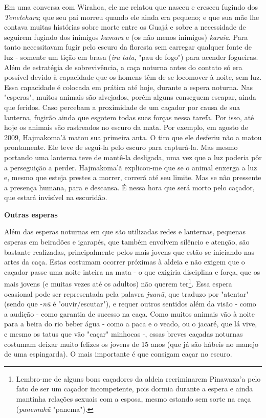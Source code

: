 Em uma conversa com Wirahoa, ele me relatou que nasceu e cresceu fugindo
dos \emph{Tenetehara}; que seu pai morreu quando ele ainda era pequeno;
e que sua mãe lhe contava muitas histórias sobre morte entre os Guajá e
sobre a necessidade de seguirem fugindo dos inimigos \emph{kamara} e (os
não menos inimigos) \emph{karaia}. Para tanto necessitavam fugir pelo
escuro da floresta sem carregar qualquer fonte de luz - somente um tição
em brasa (\emph{ira} \emph{tata}, "pau de fogo") para acender fogueiras.
Além de estratégia de sobrevivência, a caça noturna antes do contato só
era possível devido à capacidade que os homens têm de se locomover à
noite, sem luz. Essa capacidade é colocada em prática até hoje, durante
a espera noturna. Nas "esperas", muitos animais são alvejados, porém
alguns conseguem escapar, ainda que feridos. Caso percebam a proximidade
de um caçador por causa de sua lanterna, fugirão ainda que esgotem todas
suas forças nessa tarefa. Por isso, até hoje os animais são rastreados
no escuro da mata. Por exemplo, em agosto de 2009, Hajmakoma'ã matou sua
primeira anta. O tiro que ele desferiu não a matou prontamente. Ele teve
de segui-la pelo escuro para capturá-la. Mas mesmo portando uma lanterna
teve de mantê-la desligada, uma vez que a luz poderia pôr a perseguição
a perder. Hajmakoma'ã explicou-me que se o animal enxerga a luz e, mesmo
que esteja prestes a morrer, correrá até seu limite. Mas se não
pressente a presença humana, para e descansa. É nessa hora que será
morto pelo caçador, que estará invisível na escuridão.

\textbf{Outras esperas}

Além das esperas noturnas em que são utilizadas redes e lanternas,
pequenas esperas em beiradões e igarapés, que também envolvem silêncio e
atenção, são bastante realizadas, principalmente pelos mais jovens que
estão se iniciando nas artes da caça. Estas costumam ocorrer próximas à
aldeia e não exigem que o caçador passe uma noite inteira na mata - o
que exigiria disciplina e força, que os mais jovens (e muitas vezes até
os adultos) não querem ter\footnote{Lembro-me de alguns bons caçadores
  da aldeia recriminarem Pinawaxa'a pelo fato de ser um caçador
  incompetente, pois dormia durante a espera e ainda mantinha relações
  sexuais com a esposa, mesmo estando sem sorte na caça (\emph{panemuhũ}
  "panema").}. Essa espera ocasional pode ser representada pela palavra
\emph{juanũ}, que traduzo por "atentar" (sendo que -\emph{nũ} é
"ouvir/escutar"), e requer outros sentidos além da visão - como a
audição - como garantia de sucesso na caça. Como muitos animais vão à
noite para a beira do rio beber água - como a paca e o veado, ou o
jacaré, que lá vive, e mesmo os tatus que vão "caçar" minhocas -, essas
breves caçadas noturnas costumam deixar muito felizes os jovens de 15
anos (que já são hábeis no manejo de uma espingarda). O mais importante
é que consigam caçar no escuro.

